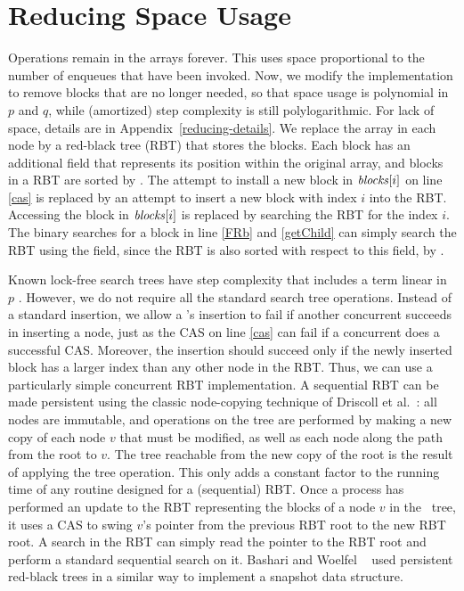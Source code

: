 
\section{Reducing Space Usage}
\label{reducing}

Operations remain in the  arrays forever. 
This uses space proportional to the number of enqueues that have been invoked.
Now, we modify the implementation to remove blocks that are no longer needed, so that space usage is
polynomial in $p$ and $q$, while (amortized) step complexity is still polylogarithmic.  For lack of space, details are in Appendix~\ref{reducing-details}.
We replace the  array in each node by a red-black tree (RBT)
that stores the blocks.
Each block has an additional  field
that represents its position within the original  array, and
blocks in a RBT are sorted by .
The attempt to install a new block in $\mbox{\textit{blocks}}[i]$  on line \ref{cas}
is replaced by an attempt to insert a new block with index $i$ into the RBT.
Accessing the block in $\mbox{\textit{blocks}}[i]$ is 
replaced by searching the RBT for the  index $i$.
The binary searches for a block in line \ref{FRb} and \ref{getChild} can simply search the RBT
using the  field, since the RBT is also sorted with respect to this field, by .
 
Known lock-free search trees have step complexity that includes a term linear in $p$ \cite{EFHR14,Ko20}.  
However, we do not require all the standard search tree operations.
Instead of a standard insertion, we allow a 's insertion to fail if another
concurrent  succeeds in inserting a node, just as the CAS on line \ref{cas}
can fail if a concurrent  does a successful CAS.
Moreover, the insertion should succeed only if the newly inserted block has a larger index than any other node in the RBT.
Thus, we can use a particularly simple concurrent RBT implementation.
A sequential RBT can be made persistent using the classic node-copying technique of 
Driscoll et al.~\cite{DSST89}:  all nodes are immutable, and operations on the 
tree are performed by making a new copy of each node $v$ that must be modified, as well
as each node along the path from the root to $v$.
The tree reachable from the new copy of the root is the result of applying the tree operation.
This only adds a constant factor to the running time of any routine designed for a (sequential) RBT.
Once a process has performed an update to the RBT representing the blocks of a node 
$v$ in the \ordering\ tree, 
it uses a CAS to swing $v$'s pointer from the previous RBT root to the new RBT root.
A search in the RBT can simply read the pointer to the RBT root and perform a standard
sequential search on it.
Bashari and Woelfel ~\cite{DBLP:conf/podc/BashariW21} used persistent red-black trees in a similar way to implement a snapshot data structure.

